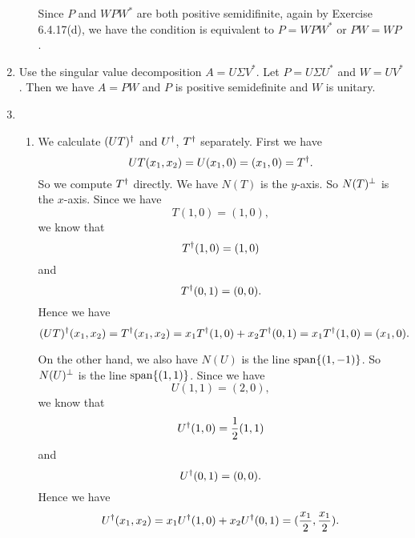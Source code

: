 \begin{enumerate}
\begin{enumerate}
Since $P$ and $WPW^*$ are both positive semidifinite, again by Exercise 6.4.17(d), we have the condition is equivalent to $P=WPW^*$ or $PW=WP$.
\end{enumerate}
\item Use the singular value decomposition $A=U\Sigma V^*$. Let $P=U\Sigma U^*$ and $W=UV^*$. Then we have $A=PW$ and $P$ is positive semidefinite and $W$ is unitary.
\item \begin{enumerate}
\item We calculate $(UT)\da $ and $U\da $, $T\da$ separately. First we have 
\[UT(x_1,x_2)=U(x_1,0)=(x_1,0)=T\da.\]
So we compute $T\da$ directly. We have $N(T)$ is the $y$-axis. So $N(T)\pp$ is the $x$-axis. Since we have 
\[T(1,0)=(1,0),\]
we know that 
\[T\da(1,0)=(1,0)\] 
and 
\[T\da(0,1)=(0,0).\]
Hence we have 
\[(UT)\da(x_1,x_2)=T\da(x_1,x_2)=x_1T\da(1,0)+x_2T\da(0,1)=x_1T\da(1,0)=(x_1,0).\]

On the other hand, we also have $N(U)$ is the line $\sp\{(1,-1)\}$. So $N(U)\pp$ is the line $\sp\{(1,1)\}$. Since we have 
\[U(1,1)=(2,0),\]
we know that 
\[U\da(1,0)=\frac{1}{2}(1,1)\]
and 
\[U\da(0,1)=(0,0).\]
Hence we have 
\[U\da(x_1,x_2)=x_1U\da(1,0)+x_2U\da(0,1)=(\frac{x_1}{2},\frac{x_1}{2}).\]


\end{enumerate}
\end{enumerate}
